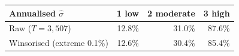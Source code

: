 \begin{tabular}{lrrr}
\toprule
Annualised $\hat\sigma$ & 1 low & 2 moderate & 3 high \\
\midrule
Raw ($T=3{,}507$)            & 12.8\% & 31.0\% & 87.6\% \\
Winsorised (extreme 0.1\%)   & 12.6\% & 30.4\% & 85.4\% \\
\bottomrule
\end{tabular}
